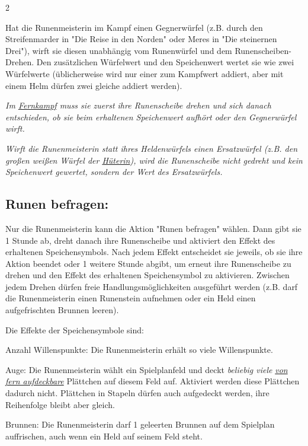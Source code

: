 \documentclass[10pt, a4paper, oneside]{book}
\newcommand{\fan}[1]{\textit{#1}}
\begin{document}
\begin{multicols*}{2}
\begin{nobgcolor}
Hat die Runenmeisterin im Kampf einen Gegnerwürfel (z.B. durch den Streifenmarder in "Die Reise in den Norden" oder Meres in "Die steinernen Drei"), wirft sie diesen unabhängig vom Runenwürfel und dem Runenscheiben-Drehen. Den zusätzlichen Würfelwert und den Speichenwert wertet sie wie zwei Würfelwerte (üblicherweise wird nur einer zum Kampfwert addiert, aber mit einem Helm dürfen zwei gleiche addiert werden).
\supercite{89633}

\fan{Im \hyperref[Fernkämpfer]{Fernkampf} muss sie zuerst ihre Runenscheibe drehen und sich danach entschieden, ob sie beim erhaltenen Speichenwert aufhört oder den Gegnerwürfel wirft.}


\fan{Wirft die Runenmeisterin statt ihres Heldenwürfels einen Ersatzwürfel (z.B. den großen weißen Würfel der \hyperref[Hüterin]{Hüterin}), wird die Runenscheibe nicht gedreht und kein Speichenwert gewertet, sondern der Wert des Ersatzwürfels.} 






\subsection{Runen befragen:}

Nur die Runenmeisterin kann die Aktion "Runen befragen" wählen. Dann gibt sie 1 Stunde ab, dreht danach ihre Runenscheibe und aktiviert den Effekt des erhaltenen Speichensymbols.\supercite{MH:Runen,89746} Nach jedem Effekt entscheidet sie jeweils, ob sie ihre Aktion beendet oder 1 weitere Stunde abgibt, um erneut ihre Runenscheibe zu drehen und den Effekt des erhaltenen Speichensymbol zu aktivieren. Zwischen jedem Drehen dürfen freie Handlungsmöglichkeiten ausgeführt werden (z.B. darf die Runenmeisterin einen Runenstein aufnehmen oder ein Held einen aufgefrischten Brunnen leeren).
\supercite{88563}


Die Effekte der Speichensymbole sind:\supercite{MH:Runen,MH:Begleitheft}

\bullet{} Anzahl Willenspunkte: Die Runenmeisterin erhält so viele Willenspunkte.

\bullet{} Auge: Die Runenmeisterin wählt ein Spielplanfeld und deckt \fan{beliebig viele} \hyperref[Aufdecken]{\fan{von fern aufdeckbare}}\supercite{88631} Plättchen auf diesem Feld auf. Aktiviert werden diese Plättchen dadurch nicht. Plättchen in Stapeln dürfen auch aufgedeckt werden, ihre Reihenfolge bleibt aber gleich.

\bullet{} Brunnen: Die Runenmeisterin darf 1 geleerten Brunnen auf dem Spielplan auffrischen, auch wenn ein Held auf seinem Feld steht.
\supercite{94130}


\end{nobgcolor}
\end{multicols*}
\end{document}
